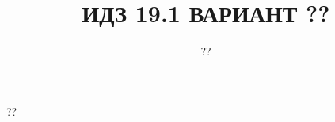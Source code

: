\documentclass[10pt]{article}
\title{ИДЗ 19.1 ВАРИАНТ ??}
\author{??}
\begin{document}
\maketitle

??
\end{document}
